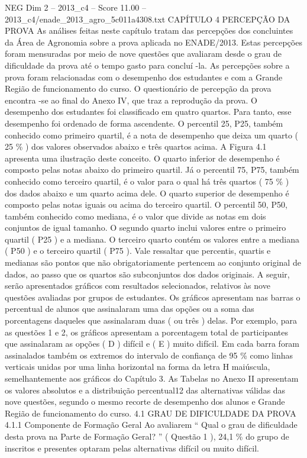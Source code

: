 \begin{textsample}{NEG Dim 2 – 2013\_c4 – Score 11.00 – 2013\_c4/enade\_2013\_agro\_5c011a4308.txt}  \label{ex:f2_neg_369}
CAPÍTULO 4 PERCEPÇÃO DA PROVA As análises feitas neste capítulo tratam das percepções dos concluintes da Área de Agronomia sobre a prova aplicada no ENADE/2013.
Estas percepções foram mensuradas por meio de nove questões que avaliaram desde o grau de dificuldade da prova até o tempo gasto para concluí -la.
As percepções sobre a prova foram relacionadas com o desempenho dos estudantes e com a Grande Região de funcionamento do curso.
O questionário de percepção da prova encontra -se ao final do Anexo IV, que traz a reprodução da prova.
O desempenho dos estudantes foi classificado em quatro quartos.
Para tanto, esse desempenho foi ordenado de forma ascendente.
O percentil 25, P25, também conhecido como primeiro quartil, é a nota de desempenho que deixa um quarto ( 25 \% ) dos valores observados abaixo e três quartos acima.
A Figura 4.1 apresenta uma ilustração deste conceito.
O quarto inferior de desempenho é composto pelas notas abaixo do primeiro quartil.
Já o percentil 75, P75, também conhecido como terceiro quartil, é o valor para o qual há três quartos ( 75 \% ) dos dados abaixo e um quarto acima dele.
O quarto superior de desempenho é composto pelas notas iguais ou acima do terceiro quartil.
O percentil 50, P50, também conhecido como mediana, é o valor que divide as notas em dois conjuntos de igual tamanho.
O segundo quarto inclui valores entre o primeiro quartil ( P25 ) e a mediana.
O terceiro quarto contém os valores entre a mediana ( P50 ) e o terceiro quartil ( P75 ).
Vale ressaltar que percentis, quartis e medianas são pontos que não obrigatoriamente pertencem ao conjunto original de dados, ao passo que os quartos são subconjuntos dos dados originais.
A seguir, serão apresentados gráficos com resultados selecionados, relativos às nove questões avaliadas por grupos de estudantes.
Os gráficos apresentam nas barras o percentual de alunos que assinalaram uma das opções ou a soma das porcentagens daqueles que assinalaram duas ( ou três ) delas.
Por exemplo, para as questões 1 e 2, os gráficos apresentam a porcentagem total de participantes que assinalaram as opções ( D ) difícil e ( E ) muito difícil.
Em cada barra foram assinalados também os extremos do intervalo de confiança de 95 \% como linhas verticais unidas por uma linha horizontal na forma da letra H maiúscula, semelhantemente aos gráficos do Capítulo 3.
As Tabelas no Anexo II apresentam os valores absolutos e a distribuição percentual12 das alternativas válidas das nove questões, segundo o mesmo recorte de desempenho dos alunos e Grande Região de funcionamento do curso. 4.1 GRAU DE DIFICULDADE DA PROVA 4.1.1 Componente de Formação Geral Ao avaliarem “ Qual o grau de dificuldade desta prova na Parte de Formação Geral? ” ( Questão 1 ), 24,1 \% do grupo de inscritos e presentes optaram pelas alternativas difícil ou muito difícil.

\end{textsample}
